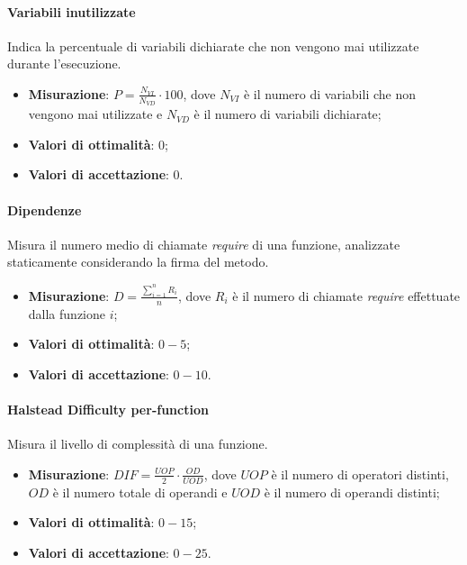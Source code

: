 \paragraph{Variabili inutilizzate}
\label{variabInutilizz}
Indica la percentuale di variabili dichiarate che non vengono mai utilizzate durante l'esecuzione.
\begin{itemize}
\item \textbf{Misurazione}: $P = \frac{N_{VI}}{N_{VD}} \cdot 100$, dove $N_{VI}$ è il numero di variabili che non vengono mai utilizzate e $N_{VD}$ è il numero di variabili dichiarate;
\item \textbf{Valori di ottimalità}: $0$;
\item \textbf{Valori di accettazione}: $0$.
\end{itemize}
\paragraph{Dipendenze}
\label{dipendenze}
Misura il numero medio di chiamate \textit{require} di una funzione, analizzate staticamente considerando la firma del metodo.
\begin{itemize}
\item \textbf{Misurazione}: $D = \frac{\sum_{i=1}^{n} R_{i}}{n}$, dove $R_{i}$ è il numero di chiamate \textit{require} effettuate dalla funzione $i$;
\item \textbf{Valori di ottimalità}: $0 - 5$;
\item \textbf{Valori di accettazione}: $0 - 10$.
\end{itemize}
\paragraph{Halstead Difficulty per-function}
\label{halDiff}
Misura il livello di complessità di una funzione.
\begin{itemize}
\item \textbf{Misurazione}: $DIF = \frac{UOP}{2} \cdot \frac{OD}{UOD}$, dove $UOP$ è il numero di operatori distinti, $OD$ è il numero totale di operandi e $UOD$ è il numero di operandi distinti;
\item \textbf{Valori di ottimalità}: $0 - 15$;
\item \textbf{Valori di accettazione}: $0 - 25$.
\end{itemize}
